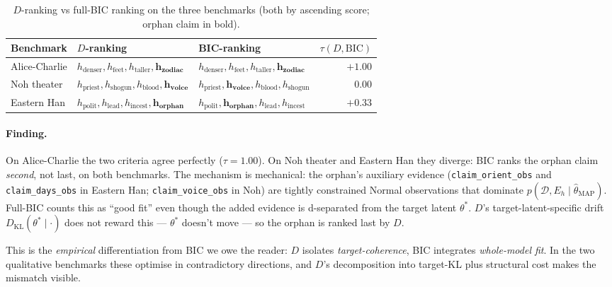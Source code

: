 \documentclass{article}
\begin{document}
\begin{table}[h]
\centering
\caption{$D$-ranking vs full-BIC ranking on the three benchmarks
(both by ascending score; orphan claim in bold).}
\label{tab:baseline}
\small
\begin{tabular}{l l l r}
\toprule
Benchmark & $D$-ranking & BIC-ranking & $\tau(D, \mathrm{BIC})$ \\
\midrule
Alice-Charlie &
  $h_{\text{denser}}, h_{\text{feet}}, h_{\text{taller}}, \mathbf{h_{\text{zodiac}}}$ &
  $h_{\text{denser}}, h_{\text{feet}}, h_{\text{taller}}, \mathbf{h_{\text{zodiac}}}$ &
  $+1.00$ \\
Noh theater &
  $h_{\text{priest}}, h_{\text{shogun}}, h_{\text{blood}}, \mathbf{h_{\text{voice}}}$ &
  $h_{\text{priest}}, \mathbf{h_{\text{voice}}}, h_{\text{blood}}, h_{\text{shogun}}$ &
  $0.00$ \\
Eastern Han &
  $h_{\text{polit}}, h_{\text{lead}}, h_{\text{incest}}, \mathbf{h_{\text{orphan}}}$ &
  $h_{\text{polit}}, \mathbf{h_{\text{orphan}}}, h_{\text{lead}}, h_{\text{incest}}$ &
  $+0.33$ \\
\bottomrule
\end{tabular}
\end{table}

\paragraph{Finding.} On Alice-Charlie the two criteria agree
perfectly ($\tau = 1.00$). On Noh theater and Eastern Han they
diverge: BIC ranks the orphan claim \emph{second}, not last, on both
benchmarks. The mechanism is mechanical: the orphan's auxiliary
evidence (\texttt{claim\_orient\_obs} and \texttt{claim\_days\_obs}
in Eastern Han; \texttt{claim\_voice\_obs} in Noh) are tightly
constrained Normal observations that dominate $p(\mathcal{D}, E_{h}
\mid \hat{\theta}_{\mathrm{MAP}})$. Full-BIC counts this as
``good fit'' even though the added evidence is d-separated from the
target latent $\theta^{*}$. $D$'s target-latent-specific drift
$D_{\mathrm{KL}}(\theta^{*} \mid \cdot)$ does not reward this ---
$\theta^{*}$ doesn't move --- so the orphan is ranked last by $D$.

This is the \emph{empirical} differentiation from BIC we owe the
reader: $D$ isolates \emph{target-coherence}, BIC integrates
\emph{whole-model fit}. In the two qualitative benchmarks these
optimise in contradictory directions, and $D$'s decomposition into
target-KL plus structural cost makes the mismatch visible.
\end{document}
